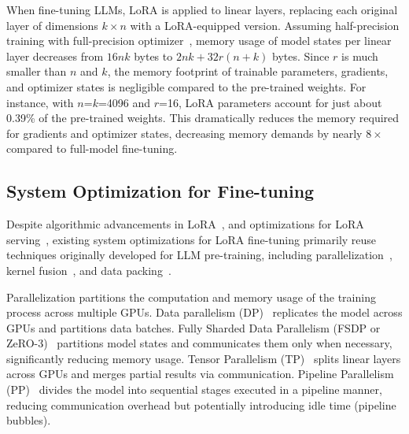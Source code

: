 When fine-tuning LLMs, LoRA is applied to linear layers, replacing each original layer of dimensions $k \times n$ with a LoRA-equipped version. 
Assuming half-precision training with full-precision optimizer~\cite{megatron-1,zero}, memory usage of model states per linear layer decreases from $16nk$ bytes to $2nk + 32r(n+k)$ bytes. 
Since $r$ is much smaller than $n$ and $k$, the memory footprint of trainable parameters, gradients, and optimizer states is negligible compared to the pre-trained weights.
For instance, with $n$=$k$=4096 and $r$=16, LoRA parameters account for just about 0.39\% of the pre-trained weights. 
This dramatically reduces the memory required for gradients and optimizer states, decreasing memory demands by nearly $8\times$ compared to full-model fine-tuning.

\subsection{System Optimization for Fine-tuning}
\label{subsec:background-system-optimization}

Despite algorithmic advancements in LoRA~\cite{dettmers2023qlora,kopiczko2023vera,liu2024dora}, and optimizations for LoRA serving~\cite{chen2024punica,sheng2023s-lora,wu2024dlora}, existing system optimizations for LoRA fine-tuning primarily reuse techniques originally developed for LLM pre-training, including parallelization~\cite{pytorch-distributed,tensorflow,zero,pytorch-fsdp,megatron-1,zheng2022alpa}, kernel fusion~\cite{tvm,hidet,ansel2024pytorch-compile,dao2022flashattention,hsu2024liger,tillet2019triton,ashari2015optimizing}, and data packing~\cite{kundu2024hf-packing-with-flash-attention,wang2024packing}.

Parallelization partitions the computation and memory usage of the training process across multiple GPUs.
Data parallelism (DP)~\cite{pytorch-distributed,tensorflow} replicates the model across GPUs and partitions data batches. 
Fully Sharded Data Parallelism (FSDP or ZeRO-3)~\cite{zero,pytorch-fsdp} partitions model states and communicates them only when necessary, significantly reducing memory usage.
Tensor Parallelism (TP)~\cite{megatron-1, megatron-2} splits linear layers across GPUs and merges partial results via communication. 
Pipeline Parallelism (PP)~\cite{gpipe,pipedream,dapple} divides the model into sequential stages executed in a pipeline manner, reducing communication overhead but potentially introducing idle time (pipeline bubbles).

